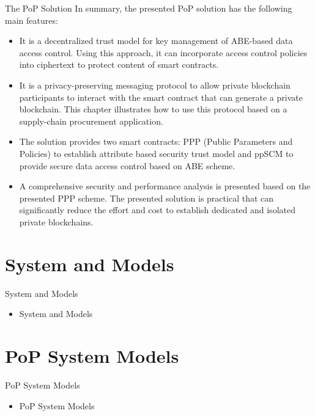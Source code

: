 \documentclass[11pt]{beamer}
\begin{document}
\begin{frame}[allowframebreaks]{The PoP Solution}
In summary, the presented PoP solution has the following main features:
\begin{itemize}
	\item It is a decentralized trust model for key management of ABE-based data access control. Using this approach, it can incorporate access control policies into ciphertext to protect content of smart contracts.
	\item It is a privacy-preserving messaging protocol to allow private blockchain participants to interact with the smart contract that can generate a private blockchain. This chapter illustrates how to use this protocol based on a supply-chain procurement application.
	\item The solution provides two smart contracts: PPP (Public Parameters and Policies) to establish attribute based security trust model and ppSCM to provide secure data access control based on ABE scheme.
	\item A comprehensive security and performance analysis is presented based on the presented PPP scheme. The presented solution is practical that can significantly reduce the effort and cost to establish dedicated and isolated private blockchains.


\end{itemize}

\end{frame}

\section{System and Models}
\begin{frame}{System and Models}
\begin{itemize}
	\item System and Models
\end{itemize}
\end{frame}

\section{PoP System Models}
\begin{frame}{PoP System Models}
\begin{itemize}
	\item PoP System Models
\end{itemize}
\end{frame}
\end{document}
